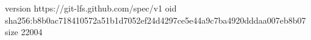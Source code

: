 version https://git-lfs.github.com/spec/v1
oid sha256:b8b0ac718410572a51b1d7052ef24d4297ce5e44a9c7ba4920dddaa007eb8b07
size 22004
